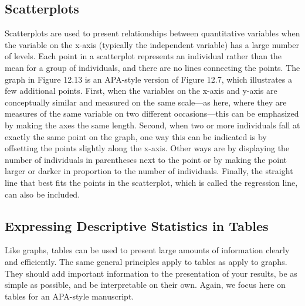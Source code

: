 \subsection{Scatterplots}


Scatterplots are used to present relationships between quantitative variables when the variable on the x-axis (typically the independent variable) has a large number of levels. Each point in a scatterplot represents an individual rather than the mean for a group of individuals, and there are no lines connecting the points. The graph in Figure 12.13 is an APA-style version of Figure 12.7, which illustrates a few additional points. First, when the variables on the x-axis and y-axis are conceptually similar and measured on the same scale---as here, where they are measures of the same variable on two different occasions---this can be emphasized by making the axes the same length. Second, when two or more individuals fall at exactly the same point on the graph, one way this can be indicated is by offsetting the points slightly along the x-axis. Other ways are by displaying the number of individuals in parentheses next to the point or by making the point larger or darker in proportion to the number of individuals. Finally, the straight line that best fits the points in the scatterplot, which is called the regression line, can also be included.



\subsection{Expressing Descriptive Statistics in Tables}

Like graphs, tables can be used to present large amounts of information clearly and efficiently. The same general principles apply to tables as apply to graphs. They should add important information to the presentation of your results, be as simple as possible, and be interpretable on their own. Again, we focus here on tables for an APA-style manuscript.

